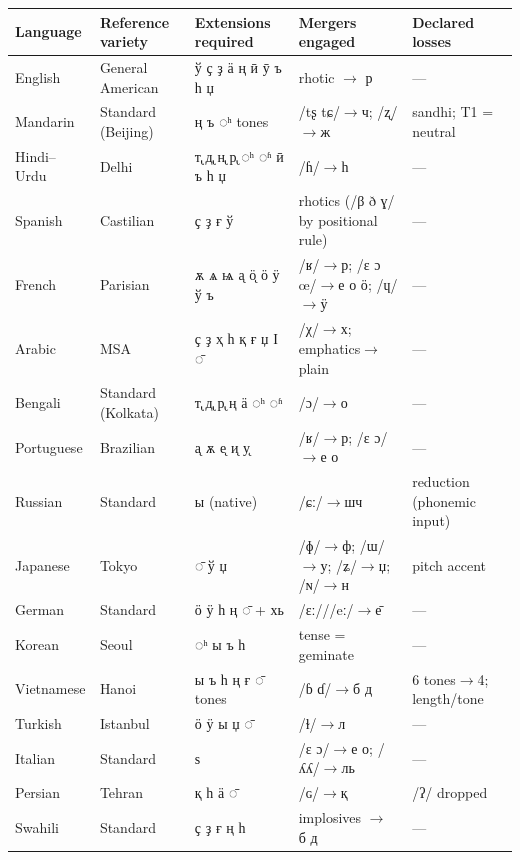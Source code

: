 \documentclass[12pt]{article}
\newcommand{\cz}[1]{{\chu #1}}
\newcommand{\ph}[1]{{\ipafont/#1/}}
\begin{document}
\begin{table}[ht]\centering\footnotesize\setlength{\tabcolsep}{3pt}
\begin{tabular}{lllll}
\toprule
Language & Reference variety & Extensions required & Mergers engaged & Declared losses \\
\midrule
English & General American & \cz{ў ҫ ҙ ӓ ң ӣ ӯ ъ һ џ} & rhotic $\rightarrow$ \cz{р} & — \\
Mandarin & Standard (Beijing) & \cz{ң ъ} \cz{◌ʰ} tones & \ph{tʂ tɕ}$\rightarrow$\cz{ч}; \ph{ʐ}$\rightarrow$\cz{ж} & sandhi; T1 = neutral \\
Hindi--Urdu & Delhi & \cz{т̢ д̢ н̢ р̢} \cz{◌ʰ ◌ʱ} \cz{ӣ ъ һ џ} & \ph{ɦ}$\rightarrow$\cz{һ} & — \\
Spanish & Castilian & \cz{ҫ ҙ ғ ў} & rhotics (\ph{β ð ɣ} by positional rule) & — \\
French & Parisian & \cz{ѫ ѧ ѩ а̨ ӧ̨ ӧ ӱ ў ъ} & \ph{ʁ}$\rightarrow$\cz{р}; \ph{ɛ ɔ œ}$\rightarrow$\cz{е о ӧ}; \ph{ɥ}$\rightarrow$\cz{ӱ} & — \\
Arabic & MSA & \cz{ҫ ҙ ҳ һ қ ғ џ Ӏ ◌̄} & \ph{χ}$\rightarrow$\cz{х}; emphatics$\rightarrow$plain & — \\
Bengali & Standard (Kolkata) & \cz{т̢ д̢ р̢ ң ӓ} \cz{◌ʰ ◌ʱ} & \ph{ɔ}$\rightarrow$\cz{о} & — \\
Portuguese & Brazilian & \cz{а̨ ѫ е̨ и̨ у̨} & \ph{ʁ}$\rightarrow$\cz{р}; \ph{ɛ ɔ}$\rightarrow$\cz{е о} & — \\
Russian & Standard & \cz{ы} (native) & \ph{ɕː}$\rightarrow$\cz{шч} & reduction (phonemic input) \\
Japanese & Tokyo & \cz{◌̄ ў џ} & \ph{ɸ}$\rightarrow$\cz{ф}; \ph{ɯ}$\rightarrow$\cz{у}; \ph{ʑ}$\rightarrow$\cz{џ}; \ph{ɴ}$\rightarrow$\cz{н} & pitch accent \\
German & Standard & \cz{ӧ ӱ һ ң ◌̄} + \cz{хь} & \ph{ɛː}/\ph{eː}$\rightarrow$\cz{е̄} & — \\
Korean & Seoul & \cz{◌ʰ} \cz{ы ъ һ} & tense = geminate & — \\
Vietnamese & Hanoi & \cz{ы ъ һ ң ғ ◌̄} tones & \ph{ɓ ɗ}$\rightarrow$\cz{б д} & 6 tones$\rightarrow$4; length/tone \\
Turkish & Istanbul & \cz{ӧ ӱ ы џ ◌̄} & \ph{ɫ}$\rightarrow$\cz{л} & — \\
Italian & Standard & \cz{ѕ} & \ph{ɛ ɔ}$\rightarrow$\cz{е о}; \ph{ʎʎ}$\rightarrow$\cz{ль} & — \\
Persian & Tehran & \cz{қ һ ӓ ◌̄} & \ph{ɢ}$\rightarrow$\cz{қ} & \ph{ʔ} dropped \\
Swahili & Standard & \cz{ҫ ҙ ғ ң һ} & implosives $\rightarrow$ \cz{б д} & — \\

\end{tabular}
\end{table}
\end{document}

